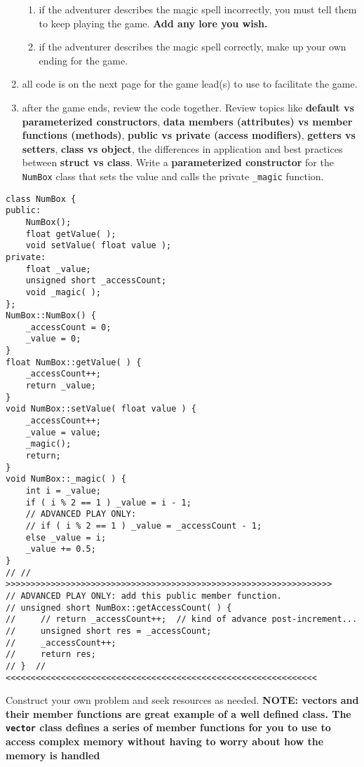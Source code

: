 \documentclass[addpoints,12pt]{exam}
\newcommand{\Soln}[1]{{\color{red}{SOLUTION: #1}}}%
\newcommand{\SolnNo}{\Soln{No solutions provided for this sample, it is up to you to verify your understanding of the topic using the resources that are available to you. Ask your peers, use office hours, use \hyperlink{https://edstem.org/us/courses/72170/discussion}{EdStem}.}}
\begin{document}
\begin{questions}
\begin{enumerate}
\begin{enumerate}
        \item if the adventurer describes the magic spell incorrectly, you must tell them to keep playing the game. \textbf{Add any lore you wish.}
        \item if the adventurer describes the magic spell correctly, make up your own ending for the game.
    \end{enumerate}
    \item all code is on the next page for the game lead(s) to use to facilitate the game.
    \item after the game ends, review the code together. Review topics like \textbf{default vs parameterized constructors}, \textbf{data members (attributes) vs member functions (methods)}, \textbf{public vs private (access modifiers)}, \textbf{getters vs setters}, \textbf{class vs object}, the differences in application and best practices between \textbf{struct vs class}. Write a \textbf{parameterized constructor} for the \texttt{NumBox} class that sets the value and calls the private \texttt{\_magic} function.
\end{enumerate}
\newpage
\begin{verbatim}
class NumBox {
public: 
    NumBox();
    float getValue( );
    void setValue( float value );
private:
    float _value;
    unsigned short _accessCount;
    void _magic( );
};
NumBox::NumBox() {
    _accessCount = 0;
    _value = 0;
}
float NumBox::getValue( ) {
    _accessCount++;
    return _value;
}
void NumBox::setValue( float value ) {
    _accessCount++;
    _value = value;
    _magic();
    return;
}
void NumBox::_magic( ) {
    int i = _value; 
    if ( i % 2 == 1 ) _value = i - 1;  
    // ADVANCED PLAY ONLY:
    // if ( i % 2 == 1 ) _value = _accessCount - 1;
    else _value = i;
    _value += 0.5;
}
// // >>>>>>>>>>>>>>>>>>>>>>>>>>>>>>>>>>>>>>>>>>>>>>>>>>>>>>>>>>>>>>>>>
// ADVANCED PLAY ONLY: add this public member function.
// unsigned short NumBox::getAccessCount( ) {
//     // return _accessCount++;  // kind of advance post-increment... 
//     unsigned short res = _accessCount;
//     _accessCount++;
//     return res;
// }  // <<<<<<<<<<<<<<<<<<<<<<<<<<<<<<<<<<<<<<<<<<<<<<<<<<<<<<<<<<<<<<
\end{verbatim}
    \newpage
    
 Construct your own problem and seek resources as needed. \textbf{NOTE: vectors and their member functions are great example of a well defined class. The \texttt{vector} class defines a series of member functions for you to use to access complex memory without having to worry about how the memory is handled}
    \newpage


\end{questions}
\end{document}
